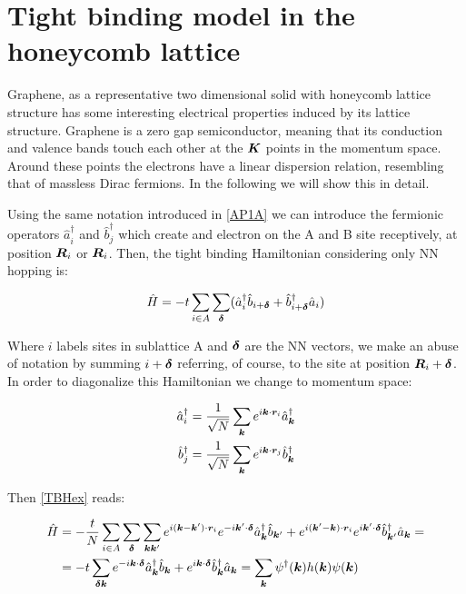 \chapter{Tight binding model in the honeycomb lattice}
\label{APD}

Graphene, as a representative two dimensional solid with honeycomb lattice structure has some interesting electrical properties induced by its lattice structure. Graphene is a zero gap semiconductor, meaning that its conduction and valence bands touch each other at the $\boldsymbol{K}$ points in the momentum space. Around these points the electrons have a linear dispersion relation, resembling that of massless Dirac fermions. In the following we will show this in detail.

Using the same notation introduced in \ref{AP1A} we can introduce the fermionic operators $\hat{a}^\dagger_i$ and $\hat{b}^\dagger_j$ which create and electron on the A and B site receptively, at position $\boldsymbol{R}_i$ or $\boldsymbol{R}_i$. Then, the tight binding Hamiltonian considering only NN hopping is:

\begin{equation}
\label{TBHex}
\hat{H} = -t\sum_{i \in A}\sum_{\boldsymbol{\delta}} (\hat{a}^\dagger_i\hat{b}_{i+\boldsymbol{\delta}} + \hat{b}^\dagger_{i+\boldsymbol{\delta}}\hat{a}_i)
\end{equation}

Where $i$ labels sites in sublattice A and $\boldsymbol{\delta}$ are the NN vectors, we make an abuse of notation by summing $i+\boldsymbol{\delta}$ referring, of course, to the site at position $\boldsymbol{R}_i+\boldsymbol{\delta}$. In order to diagonalize this Hamiltonian we change to momentum space:

\begin{align}
\hat{a}^\dagger_i &= \frac{1}{\sqrt{N}} \sum_{\boldsymbol{k}} e^{i\boldsymbol{k}\cdot\boldsymbol{r}_i}\hat{a}^\dagger_{\boldsymbol{k}} \\
\hat{b}^\dagger_j &= \frac{1}{\sqrt{N}} \sum_{\boldsymbol{k}} e^{i\boldsymbol{k}\cdot\boldsymbol{r}_j}\hat{b}^\dagger_{\boldsymbol{k}} 
\end{align}

Then \ref{TBHex} reads:

\begin{align*}
\hat{H} &= -\frac{t}{N} \sum_{i \in A}\sum_{\boldsymbol{\delta}} \sum_{\boldsymbol{k}\boldsymbol{k}'} e^{i(\boldsymbol{k}-\boldsymbol{k}')\cdot\boldsymbol{r}_i}e^{-i\boldsymbol{k}'\cdot\boldsymbol{\delta}} \hat{a}^\dagger_{\boldsymbol{k}}\hat{b}_{\boldsymbol{k}'} + e^{i(\boldsymbol{k}'-\boldsymbol{k})\cdot\boldsymbol{r}_i}e^{i\boldsymbol{k}'\cdot\boldsymbol{\delta}} \hat{b}^\dagger_{\boldsymbol{k}'}\hat{a}_{\boldsymbol{k}} = \\
&= -t \sum_{\boldsymbol{\delta}\boldsymbol{k}} e^{-i\boldsymbol{k}\cdot\boldsymbol{\delta}} \hat{a}^\dagger_{\boldsymbol{k}}\hat{b}_{\boldsymbol{k}} +e^{i\boldsymbol{k}\cdot\boldsymbol{\delta}} \hat{b}^\dagger_{\boldsymbol{k}}\hat{a}_{\boldsymbol{k}} = \sum_{\boldsymbol{k}} \psi^\dagger(\boldsymbol{k})h(\boldsymbol{k})\psi(\boldsymbol{k})
\end{align*}

